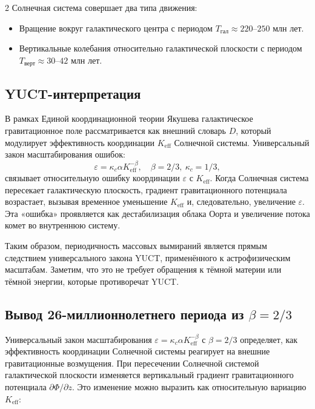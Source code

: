 \documentclass[11pt,a4paper]{article}
\begin{document}
\begin{multicols}{2}
		Солнечная система совершает два типа движения:
		\begin{itemize}
			\item Вращение вокруг галактического центра с периодом \(T_{\text{гал}} \approx 220\)–\(250\) млн лет.
			\item Вертикальные колебания относительно галактической плоскости с периодом \(T_{\text{верт}} \approx 30\)–\(42\) млн лет.
		\end{itemize}
		
		\subsection{YUCT-интерпретация}
		
		В рамках Единой координационной теории Якушева галактическое гравитационное поле рассматривается как внешний словарь \(D\), который модулирует эффективность координации \(K_{\mathrm{eff}}\) Солнечной системы. Универсальный закон масштабирования ошибок:
		\[
		\varepsilon = \kappa_c \alpha K_{\mathrm{eff}}^{-\beta},\quad \beta = 2/3,\ \kappa_c = 1/3,
		\]
		связывает относительную ошибку координации \(\varepsilon\) с \(K_{\mathrm{eff}}\). Когда Солнечная система пересекает галактическую плоскость, градиент гравитационного потенциала возрастает, вызывая временное уменьшение \(K_{\mathrm{eff}}\) и, следовательно, увеличение \(\varepsilon\). Эта «ошибка» проявляется как дестабилизация облака Оорта и увеличение потока комет во внутреннюю систему.
		
		Таким образом, периодичность массовых вымираний является прямым следствием универсального закона YUCT, применённого к астрофизическим масштабам. Заметим, что это не требует обращения к тёмной материи или тёмной энергии, которые противоречат YUCT.
		
		\subsection{Вывод 26-миллионнолетнего периода из \(\beta = 2/3\)}
		
		Универсальный закон масштабирования $\varepsilon = \kappa_c \alpha K_{\mathrm{eff}}^{-\beta}$ с $\beta = 2/3$ определяет, как эффективность координации Солнечной системы реагирует на внешние гравитационные возмущения. При пересечении Солнечной системой галактической плоскости изменяется вертикальный градиент гравитационного потенциала $\partial \Phi / \partial z$. Это изменение можно выразить как относительную вариацию $K_{\mathrm{eff}}$:
		

\end{multicols}
\end{document}
